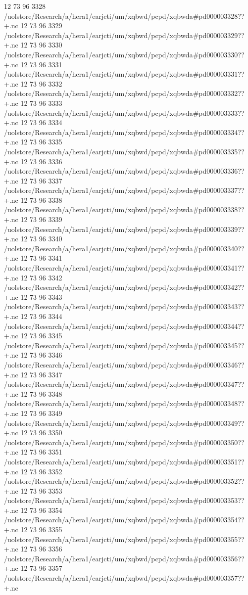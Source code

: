 12 73 96
3328
/uolstore/Research/a/hera1/earjcti/um/xqbwd/pcpd/xqbwda#pd000003328??+.nc
12 73 96
3329
/uolstore/Research/a/hera1/earjcti/um/xqbwd/pcpd/xqbwda#pd000003329??+.nc
12 73 96
3330
/uolstore/Research/a/hera1/earjcti/um/xqbwd/pcpd/xqbwda#pd000003330??+.nc
12 73 96
3331
/uolstore/Research/a/hera1/earjcti/um/xqbwd/pcpd/xqbwda#pd000003331??+.nc
12 73 96
3332
/uolstore/Research/a/hera1/earjcti/um/xqbwd/pcpd/xqbwda#pd000003332??+.nc
12 73 96
3333
/uolstore/Research/a/hera1/earjcti/um/xqbwd/pcpd/xqbwda#pd000003333??+.nc
12 73 96
3334
/uolstore/Research/a/hera1/earjcti/um/xqbwd/pcpd/xqbwda#pd000003334??+.nc
12 73 96
3335
/uolstore/Research/a/hera1/earjcti/um/xqbwd/pcpd/xqbwda#pd000003335??+.nc
12 73 96
3336
/uolstore/Research/a/hera1/earjcti/um/xqbwd/pcpd/xqbwda#pd000003336??+.nc
12 73 96
3337
/uolstore/Research/a/hera1/earjcti/um/xqbwd/pcpd/xqbwda#pd000003337??+.nc
12 73 96
3338
/uolstore/Research/a/hera1/earjcti/um/xqbwd/pcpd/xqbwda#pd000003338??+.nc
12 73 96
3339
/uolstore/Research/a/hera1/earjcti/um/xqbwd/pcpd/xqbwda#pd000003339??+.nc
12 73 96
3340
/uolstore/Research/a/hera1/earjcti/um/xqbwd/pcpd/xqbwda#pd000003340??+.nc
12 73 96
3341
/uolstore/Research/a/hera1/earjcti/um/xqbwd/pcpd/xqbwda#pd000003341??+.nc
12 73 96
3342
/uolstore/Research/a/hera1/earjcti/um/xqbwd/pcpd/xqbwda#pd000003342??+.nc
12 73 96
3343
/uolstore/Research/a/hera1/earjcti/um/xqbwd/pcpd/xqbwda#pd000003343??+.nc
12 73 96
3344
/uolstore/Research/a/hera1/earjcti/um/xqbwd/pcpd/xqbwda#pd000003344??+.nc
12 73 96
3345
/uolstore/Research/a/hera1/earjcti/um/xqbwd/pcpd/xqbwda#pd000003345??+.nc
12 73 96
3346
/uolstore/Research/a/hera1/earjcti/um/xqbwd/pcpd/xqbwda#pd000003346??+.nc
12 73 96
3347
/uolstore/Research/a/hera1/earjcti/um/xqbwd/pcpd/xqbwda#pd000003347??+.nc
12 73 96
3348
/uolstore/Research/a/hera1/earjcti/um/xqbwd/pcpd/xqbwda#pd000003348??+.nc
12 73 96
3349
/uolstore/Research/a/hera1/earjcti/um/xqbwd/pcpd/xqbwda#pd000003349??+.nc
12 73 96
3350
/uolstore/Research/a/hera1/earjcti/um/xqbwd/pcpd/xqbwda#pd000003350??+.nc
12 73 96
3351
/uolstore/Research/a/hera1/earjcti/um/xqbwd/pcpd/xqbwda#pd000003351??+.nc
12 73 96
3352
/uolstore/Research/a/hera1/earjcti/um/xqbwd/pcpd/xqbwda#pd000003352??+.nc
12 73 96
3353
/uolstore/Research/a/hera1/earjcti/um/xqbwd/pcpd/xqbwda#pd000003353??+.nc
12 73 96
3354
/uolstore/Research/a/hera1/earjcti/um/xqbwd/pcpd/xqbwda#pd000003354??+.nc
12 73 96
3355
/uolstore/Research/a/hera1/earjcti/um/xqbwd/pcpd/xqbwda#pd000003355??+.nc
12 73 96
3356
/uolstore/Research/a/hera1/earjcti/um/xqbwd/pcpd/xqbwda#pd000003356??+.nc
12 73 96
3357
/uolstore/Research/a/hera1/earjcti/um/xqbwd/pcpd/xqbwda#pd000003357??+.nc
